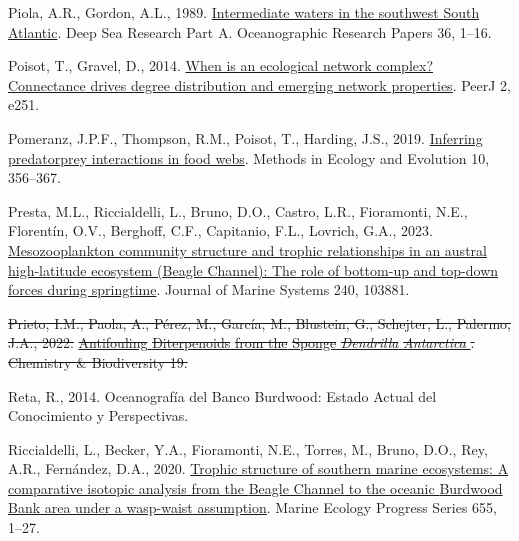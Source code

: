 \documentclass[
]{article}
\newlength{\cslhangindent}
\newenvironment{CSLReferences}[2] %
 {\begin{list}{}{%
  \setlength{\itemindent}{0pt}
  \setlength{\leftmargin}{0pt}
  \setlength{\parsep}{0pt}
  \ifodd #1
   \setlength{\leftmargin}{\cslhangindent}
   \setlength{\itemindent}{-1\cslhangindent}
  \fi
  \setlength{\itemsep}{#2\baselineskip}}}
 {\end{list}}
\providecommand{\DIFdel}[1]{{\protect\color{red}\sout{#1}}}                      %
\providecommand{\DIFdelbegin}{} %
\providecommand{\DIFdelend}{} %
\newcommand{\DIFscaledelfig}{0.5}
\newlength{\DIFdelgraphicswidth} %
\newlength{\DIFdelgraphicsheight} %
\newcommand{\DIFdelincludegraphics}[2][]{%
\sbox{\DIFdelgraphicsbox}{\DIFOincludegraphics[#1]{#2}}%
\settoboxwidth{\DIFdelgraphicswidth}{\DIFdelgraphicsbox} %
\settoboxtotalheight{\DIFdelgraphicsheight}{\DIFdelgraphicsbox} %
\scalebox{\DIFscaledelfig}{%
\parbox[b]{\DIFdelgraphicswidth}{\usebox{\DIFdelgraphicsbox}\\[-\baselineskip] \rule{\DIFdelgraphicswidth}{0em}}\llap{\resizebox{\DIFdelgraphicswidth}{\DIFdelgraphicsheight}{%
\setlength{\unitlength}{\DIFdelgraphicswidth}%
\begin{picture}(1,1)%
\thicklines\linethickness{2pt} %
{\color[rgb]{1,0,0}\put(0,0){\framebox(1,1){}}}%
{\color[rgb]{1,0,0}\put(0,0){\line( 1,1){1}}}%
{\color[rgb]{1,0,0}\put(0,1){\line(1,-1){1}}}%
\end{picture}%
}\hspace*{3pt}}} %
} %
\DeclareRobustCommand{\DIFdelbegin}{\DIFOdelbegin \let\includegraphics\DIFdelincludegraphics} %
\DeclareRobustCommand{\DIFdelend}{\DIFOaddend \let\includegraphics\DIFOincludegraphics} %
\begin{document}
\begin{CSLReferences}{1}{0}
Piola, A.R., Gordon, A.L., 1989.
\href{https://doi.org/10.1016/0198-0149(89)90015-0}{Intermediate waters
in the southwest {South Atlantic}}. Deep Sea Research Part A.
Oceanographic Research Papers 36, 1--16.

Poisot, T., Gravel, D., 2014.
\href{https://doi.org/10.7717/peerj.251}{When is an ecological network
complex? {Connectance} drives degree distribution and emerging network
properties}. PeerJ 2, e251.

Pomeranz, J.P.F., Thompson, R.M., Poisot, T., Harding, J.S., 2019.
\href{https://doi.org/10.1111/2041-210X.13125}{Inferring
predator{\textendash}prey interactions in food webs}. Methods in Ecology
and Evolution 10, 356--367.

Presta, M.L., Riccialdelli, L., Bruno, D.O., Castro, L.R., Fioramonti,
N.E., Florentín, O.V., Berghoff, C.F., Capitanio, F.L., Lovrich, G.A.,
2023.
\href{https://doi.org/10.1016/j.jmarsys.2023.103881}{Mesozooplankton
community structure and trophic relationships in an austral
high-latitude ecosystem ({Beagle Channel}): {The} role of bottom-up and
top-down forces during springtime}. Journal of Marine Systems 240,
103881.

\DIFdelbegin {}
\DIFdel{Prieto, I.M., Paola, A., Pérez, M., García, M., Blustein, G., Schejter,
L., Palermo, J.A., 2022.
}\href{https://doi.org/10.1002/cbdv.202100618}{\DIFdel{Antifouling }%
\DIFdel{Diterpenoids}%
\DIFdel{from the }%
\DIFdel{Sponge}%
\emph{\DIFdel{Dendrilla}}%
\emph{\DIFdel{Antarctica}}%
}%
\DIFdel{. Chemistry \&
Biodiversity 19.
}%

\DIFdelend {}
Reta, R., 2014. Oceanograf{í}a del {Banco Burdwood}: {Estado Actual} del
{Conocimiento} y {Perspectivas}.

Riccialdelli, L., Becker, Y.A., Fioramonti, N.E., Torres, M., Bruno,
D.O., Rey, A.R., Fernández, D.A., 2020.
\href{https://doi.org/10.3354/meps13524}{Trophic structure of southern
marine ecosystems: A comparative isotopic analysis from the {Beagle
Channel} to the oceanic {Burdwood Bank} area under a wasp-waist
assumption}. Marine Ecology Progress Series 655, 1--27.


\end{CSLReferences}
\end{document}
